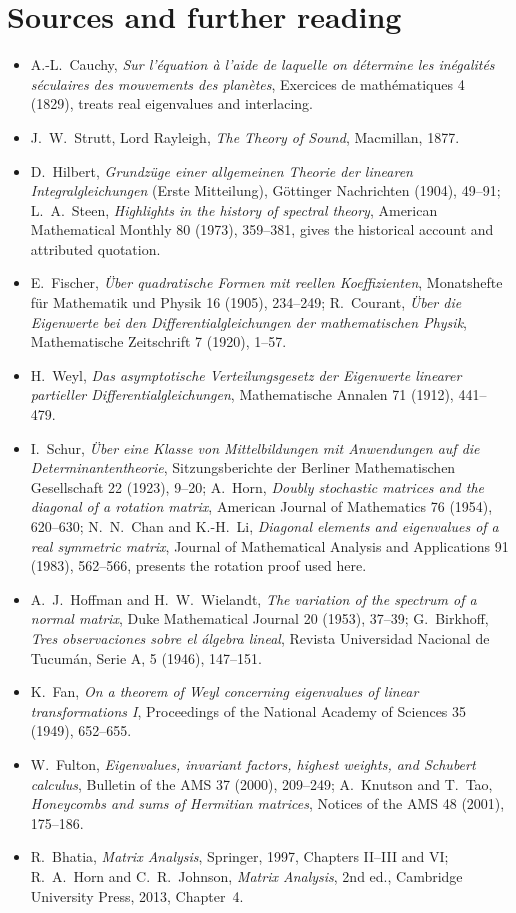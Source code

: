 \section*{Sources and further reading}
\begin{itemize}
\item A.-L.~Cauchy, \emph{Sur l'\'equation \`a l'aide de laquelle on d\'etermine les in\'egalit\'es s\'eculaires des mouvements des plan\`etes}, Exercices de math\'ematiques 4 (1829), treats real eigenvalues and interlacing.
\item J.~W.~Strutt, Lord Rayleigh, \emph{The Theory of Sound}, Macmillan, 1877.
\item D.~Hilbert, \emph{Grundz\"uge einer allgemeinen Theorie der linearen Integralgleichungen} (Erste Mitteilung), G\"ottinger Nachrichten (1904), 49--91; L.~A.~Steen, \emph{Highlights in the history of spectral theory}, American Mathematical Monthly 80 (1973), 359--381, gives the historical account and attributed quotation.
\item E.~Fischer, \emph{\"Uber quadratische Formen mit reellen Koeffizienten}, Monatshefte f\"ur Mathematik und Physik 16 (1905), 234--249; R.~Courant, \emph{\"Uber die Eigenwerte bei den Differentialgleichungen der mathematischen Physik}, Mathematische Zeitschrift 7 (1920), 1--57.
\item H.~Weyl, \emph{Das asymptotische Verteilungsgesetz der Eigenwerte linearer partieller Differentialgleichungen}, Mathematische Annalen 71 (1912), 441--479.
\item I.~Schur, \emph{\"Uber eine Klasse von Mittelbildungen mit Anwendungen auf die Determinantentheorie}, Sitzungsberichte der Berliner Mathematischen Gesellschaft 22 (1923), 9--20; A.~Horn, \emph{Doubly stochastic matrices and the diagonal of a rotation matrix}, American Journal of Mathematics 76 (1954), 620--630; N.~N.~Chan and K.-H.~Li, \emph{Diagonal elements and eigenvalues of a real symmetric matrix}, Journal of Mathematical Analysis and Applications 91 (1983), 562--566, presents the rotation proof used here.
\item A.~J.~Hoffman and H.~W.~Wielandt, \emph{The variation of the spectrum of a normal matrix}, Duke Mathematical Journal 20 (1953), 37--39; G.~Birkhoff, \emph{Tres observaciones sobre el \'algebra lineal}, Revista Universidad Nacional de Tucum\'an, Serie A, 5 (1946), 147--151.
\item K.~Fan, \emph{On a theorem of Weyl concerning eigenvalues of linear transformations I}, Proceedings of the National Academy of Sciences 35 (1949), 652--655.
\item W.~Fulton, \emph{Eigenvalues, invariant factors, highest weights, and Schubert calculus}, Bulletin of the AMS 37 (2000), 209--249; A.~Knutson and T.~Tao, \emph{Honeycombs and sums of Hermitian matrices}, Notices of the AMS 48 (2001), 175--186.
\item R.~Bhatia, \emph{Matrix Analysis}, Springer, 1997, Chapters II--III and VI; R.~A.~Horn and C.~R.~Johnson, \emph{Matrix Analysis}, 2nd ed., Cambridge University Press, 2013, Chapter~4.
\end{itemize}
